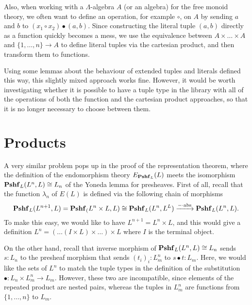 Also, when working with a $ \Lambda $-algebra $ A $ (or an algebra) for the free monoid theory, we often want to define an operation, for example $ \circ $, on $ A $ by sending $ a $ and $ b $ to $ (x_1 \circ x_2) \bullet (a, b) $. Since constructing the literal tuple $ (a, b) $ directly as a function quickly becomes a mess, we use the equivalence between $ A \times \dots \times A $ and $ \{ 1, \dots, n \} \to A $ to define literal tuples via the cartesian product, and then transform them to functions.

Using some lemmas about the behaviour of extended tuples and literals defined this way, this slightly mixed approach works fine. However, it would be worth investigating whether it is possible to have a tuple type in the library with all of the operations of both the function and the cartesian product approaches, so that it is no longer necessary to choose between them.

\section{Products}
A very similar problem pops up in the proof of the representation theorem, where the definition of the endomorphism theory $ E_{\mathbf{Pshf}_{L}}(L) $ meets the isomorphism $ \mathbf{Pshf}_{L}(L^n, L) \cong L_n $ of the Yoneda lemma for presheaves. First of all, recall that the function $ \lambda_n $ of $ E(L) $ is defined via the following chain of morphisms
\[ \mathbf{Pshf}_{L}(L^{n + 1}, L) = \mathbf{Pshf}_{(}L^n \times L, L) \cong \mathbf{Pshf}_{L}(L^n, L^L) \xrightarrow{- \cdot \text{abs}} \mathbf{Pshf}_{L}(L^n, L). \]
To make this easy, we would like to have $ L^{n + 1} = L^n \times L $, and this would give a definition $ L^n = ( \dots (I \times L) \times \dots) \times L $ where $ I $ is the terminal object.

On the other hand, recall that inverse morphism of $ \mathbf{Pshf}_{L}(L^n, L) \cong L_n $ sends $ s: L_n $ to the presheaf morphism that sends $ (t_i)_i : L^n_m $ to $ s \bullet t : L_m $. Here, we would like the sets of $ L^n $ to match the tuple types in the definition of the substitution $ \bullet : L_n \times L_m^n \to L_m $. However, these two are incompatible, since elements of the repeated product are nested pairs, whereas the tuples in $ L_m^n $ are functions from $ \{ 1, \dots, n \} $ to $ L_m $.

